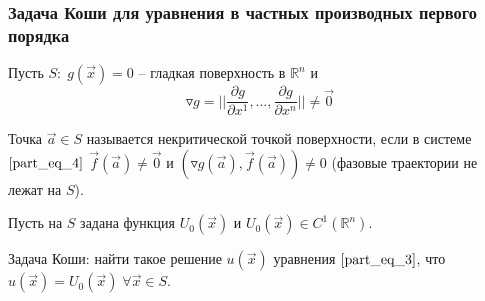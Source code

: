 \subsubsection{Задача Коши для уравнения в частных производных первого порядка}

Пусть $S: \; g \left( \overrightarrow{x} \right) = 0$ -- гладкая поверхность в $\mathbb{R}^n$ и 
\begin{equation*}
    \triangledown g = \bigg| \bigg| \frac{\partial g}{\partial x^{1}}, \dots, \frac{\partial g}{\partial x^{n}} \bigg| \bigg| \neq \overrightarrow{0}
\end{equation*}

\begin{definition}
    Точка $\overrightarrow{a} \in S$ называется некритической точкой поверхности, если в системе $\eqref{part_eq_4}$ $\overrightarrow{f} \left( \overrightarrow{a} \right) \neq \overrightarrow{0}$ и $ \left( \triangledown g \left( \overrightarrow{a} \right), \overrightarrow{f} \left( \overrightarrow{a} \right) \right) \neq 0$  (фазовые траектории не лежат на $S$).
\end{definition}

Пусть на $S$ задана функция $U_0 \left( \overrightarrow{x} \right)$ и $U_0 \left( \overrightarrow{x} \right) \in C^1 \left( \mathbb{R}^n \right)$.

Задача Коши: найти такое решение $u \left( \overrightarrow{x} \right)$ уравнения $\eqref{part_eq_3}$, что $u \left( \overrightarrow{x} \right) = U_0 \left( \overrightarrow{x} \right) \; \forall \overrightarrow{x} \in S$.

